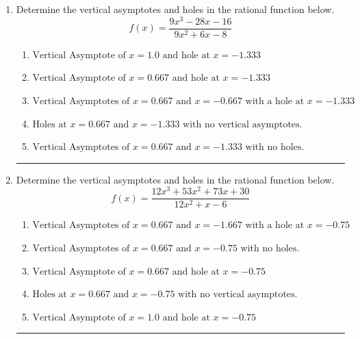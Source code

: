 \documentclass[14pt]{extbook}
\newcommand{\litem}[1]{\item#1\hspace*{-1cm}\rule{\textwidth}{0.4pt}}
\begin{document}
\begin{enumerate}
{\begin{enumerate}[label=\Alph*.]
\end{enumerate} }
\litem{
Determine the vertical asymptotes and holes in the rational function below.\[ f(x) = \frac{9x^{3} -28 x -16}{9x^{2} +6 x -8} \]\begin{enumerate}[label=\Alph*.]
\item \( \text{Vertical Asymptote of } x = 1.0 \text{ and hole at } x = -1.333 \)
\item \( \text{Vertical Asymptote of } x = 0.667 \text{ and hole at } x = -1.333 \)
\item \( \text{Vertical Asymptotes of } x = 0.667 \text{ and } x = -0.667 \text{ with a hole at } x = -1.333 \)
\item \( \text{Holes at } x = 0.667 \text{ and } x = -1.333 \text{ with no vertical asymptotes.} \)
\item \( \text{Vertical Asymptotes of } x = 0.667 \text{ and } x = -1.333 \text{ with no holes.} \)

\end{enumerate} }
\litem{
Determine the vertical asymptotes and holes in the rational function below.\[ f(x) = \frac{12x^{3} +53 x^{2} +73 x + 30}{12x^{2} +x -6} \]\begin{enumerate}[label=\Alph*.]
\item \( \text{Vertical Asymptotes of } x = 0.667 \text{ and } x = -1.667 \text{ with a hole at } x = -0.75 \)
\item \( \text{Vertical Asymptotes of } x = 0.667 \text{ and } x = -0.75 \text{ with no holes.} \)
\item \( \text{Vertical Asymptote of } x = 0.667 \text{ and hole at } x = -0.75 \)
\item \( \text{Holes at } x = 0.667 \text{ and } x = -0.75 \text{ with no vertical asymptotes.} \)
\item \( \text{Vertical Asymptote of } x = 1.0 \text{ and hole at } x = -0.75 \)

\end{enumerate} }
\end{enumerate}
\end{document}
